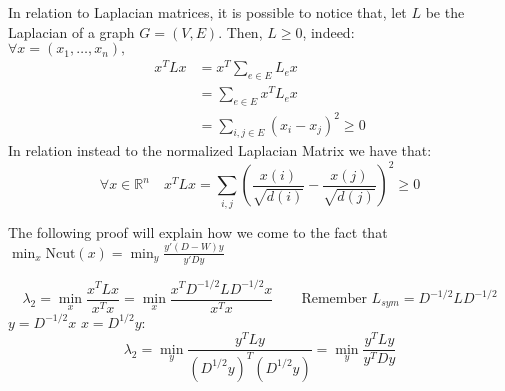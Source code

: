 \begin{thm}{} In relation to Laplacian matrices, it is possible to notice that, let $L$ be the Laplacian of a graph $G=(V,E)$. Then, $L \geq 0$, indeed:\\
$\forall x = (x_1, \dots, x_n),$
$$\begin{aligned} x^{T}Lx &= x^{T} \sum_{e \in E} L_{e} x \\ &=\sum_{e \in E} x^T L_{e} x \\ &=\sum_{i, j \in E}\left(x_{i}-x_{j}\right)^{2} \geq 0 \end{aligned}$$
In relation instead to the normalized Laplacian Matrix we have that:
$$\forall x \in \mathbb{R}^n \quad x^TLx = \sum_{i,j} \left(\frac{x(i)}{\sqrt{d(i)}} - \frac{x(j)}{\sqrt{d(j)}} \right)^2 \geq 0$$
\end{thm}
\par \bigskip \bigskip \noindent
The following proof will explain how we come to the fact that $\min_x \text{Ncut}(x) = \min_y \frac{y'(D-W)y}{y'Dy}$
\begin{thm}{}
$$\lambda_2 = \min_x \frac{x^TLx}{x^Tx} = \min_x \frac{x^TD^{-1/2}LD^{-1/2}x}{x^Tx} \qquad \text{Remember } L_{sym} = D^{-1/2}LD^{-1/2}$$
 $y=D^{-1/2}x$  $x = D^{1/2}y$:
$$\lambda_2 = \min_y \frac{y^TLy}{(D^{1/2}y)^T(D^{1/2}y)} = \min_y \frac{y^TLy}{y^TDy}$$
\end{thm}

